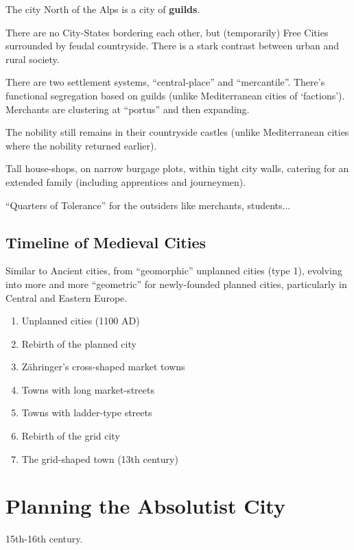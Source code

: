 \documentclass{article}
\begin{document}
The city North of the Alps is a city of \textbf{guilds}. 

There are no City-States bordering each other, but (temporarily) Free Cities surrounded by feudal countryside. There is a stark contrast between urban and rural society.

There are two settlement systems, ``central-place'' and ``mercantile''. There's functional segregation based on guilds (unlike Mediterranean cities of `factions').
Merchants are clustering at ``portus'' and then expanding.

The nobility still remains in their countryside castles (unlike Mediterranean cities where the nobility returned earlier). 

Tall house-shops, on narrow burgage plots, within tight city walls, catering for an extended family (including apprentices and journeymen).

``Quarters of Tolerance'' for the outsiders like merchants, students...

\subsection{Timeline of Medieval Cities}

Similar to Ancient cities, from ``geomorphic'' unplanned cities (type 1), evolving into more and more ``geometric'' for newly-founded planned cities, particularly in Central and Eastern Europe.

\begin{enumerate}
	\item Unplanned cities (1100 AD)
	\item Rebirth of the planned city
	\item Zähringer's cross-shaped market towns
	\item Towns with long market-streets
	\item Towns with ladder-type streets
	\item Rebirth of the grid city
	\item The grid-shaped town (13th century)
\end{enumerate}

\section{Planning the Absolutist City}

15th-16th century. 
\end{document}
